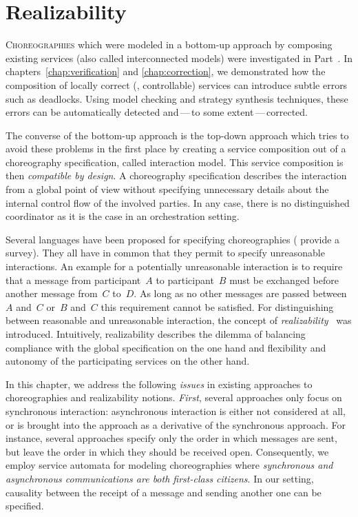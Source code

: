 \chapter{Realizability}
\label{chap:realizability}%


\lettrine[findent=.2em,lines=2,nindent=0pt]{C}{horeographies} which were modeled in a bottom-up approach by composing existing services (also called interconnected models) were investigated in Part~. In chapters~\ref{chap:verification} and \ref{chap:correction}, we demonstrated how the composition of locally correct (\ie, controllable) services can introduce subtle errors such as deadlocks. Using model checking and strategy synthesis techniques, these errors can be automatically detected and\,---\,to some extent\,---\,corrected.

The converse of the bottom-up approach is the top-down approach which tries to avoid these problems in the first place by creating a service composition out of a choreography specification, called interaction model. This service composition is then \emph{compatible by design}. A choreography specification describes the interaction from a global point of view without specifying unnecessary details about the internal control flow of the involved parties. In any case, there is no distinguished coordinator as it is the case in an orchestration setting.

Several languages have been proposed for specifying choreographies (\citet{SuBFZ_2007_wsfm} provide a survey). They all have in common that they permit to specify unreasonable interactions. An example for a potentially unreasonable interaction is to require that a message from participant~$A$ to participant~$B$ must be exchanged before another message from~$C$ to~$D$. As long as no other messages are passed between~$A$ and~$C$ or~$B$ and~$C$ this requirement cannot be satisfied. For distinguishing between reasonable and unreasonable interaction, the concept of \emph{realizability}~\cite{FuBS_2004_tcs,AlurEY_2003_tse} was introduced. Intuitively, realizability describes the dilemma of balancing compliance with the global specification on the one hand and flexibility and autonomy of the participating services on the other hand.

In this chapter, we address the following \emph{issues} in existing approaches to choreographies and realizability notions. \emph{First}, several approaches only focus on synchronous interaction: asynchronous interaction is either not considered at all, or is brought into the approach as a derivative of the synchronous approach. For instance, several approaches specify only the order in which messages are sent, but leave the order in which they should be received open. Consequently, we employ service automata for modeling choreographies where \emph{synchronous and asynchronous communications are both first-class citizens}. In our setting, causality between the receipt of a message and sending another one can be specified.

